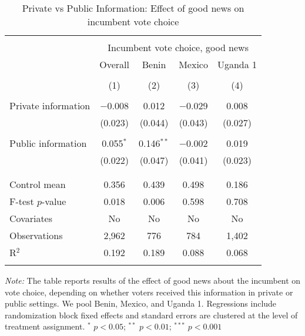 
\begin{table}[htb] \centering 
  \caption{Private vs Public Information: Effect of good news on incumbent vote choice} 
  \label{pvt_pub_good} 
\begin{tabular}{@{\extracolsep{5pt}}lcccc} 
\\[-1.8ex]\hline 
\hline \\[-1.8ex] 
 & \multicolumn{4}{c}{Incumbent vote choice, good news} \\ 
\cline{2-5} 
 & Overall & Benin & Mexico & Uganda 1 \\ 
\\[-1.8ex] & (1) & (2) & (3) & (4)\\ 
\hline \\[-1.8ex] 
 Private information & $-$0.008 & 0.012 & $-$0.029 & 0.008 \\ 
  & (0.023) & (0.044) & (0.043) & (0.027) \\ 
  & & & & \\ 
 Public information & 0.055$^{*}$ & 0.146$^{**}$ & $-$0.002 & 0.019 \\ 
  & (0.022) & (0.047) & (0.041) & (0.023) \\ 
  & & & & \\ 
\hline \\[-1.8ex] 
Control mean & 0.356 & 0.439 & 0.498 & 0.186 \\ 
F-test $p$-value & 0.018 & 0.006 & 0.598 & 0.708 \\ 
Covariates & No & No & No & No \\ 
Observations & 2,962 & 776 & 784 & 1,402 \\ 
R$^{2}$ & 0.192 & 0.189 & 0.088 & 0.068 \\ 
\hline 
\hline \\[-1.8ex] 
\end{tabular} 
\begin{flushleft}\textit{Note:} The table reports results of the effect of good news about the incumbent on vote choice, depending on whether voters received this information in private or public settings. We pool Benin, Mexico, and Uganda 1. Regressions include randomization block fixed effects and standard errors are clustered at the level of treatment assignment. $^*$ $p<0.05$; $^{**}$ $p<0.01$; $^{***}$ $p<0.001$ \end{flushleft}
\end{table} 
